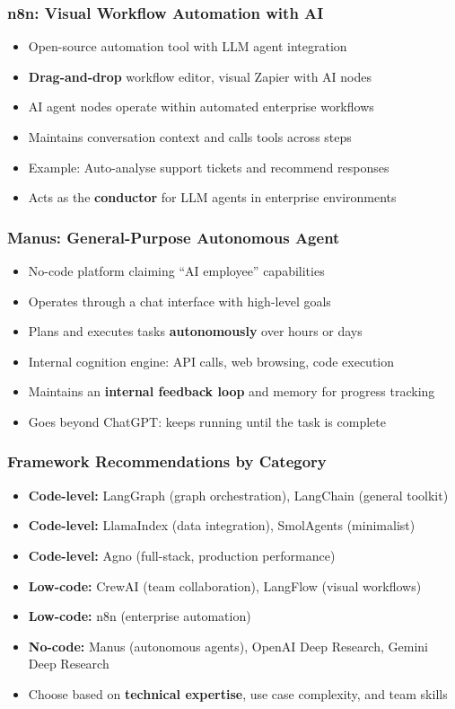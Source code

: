 \begin{frame}[fragile]\frametitle{n8n: Visual Workflow Automation with AI}
      \begin{itemize}
	  \item Open-source automation tool with LLM agent integration
	  \item \textbf{Drag-and-drop} workflow editor, visual Zapier with AI nodes
	  \item AI agent nodes operate within automated enterprise workflows
	  \item Maintains conversation context and calls tools across steps
	  \item Example: Auto-analyse support tickets and recommend responses
	  \item Acts as the \textbf{conductor} for LLM agents in enterprise environments
	  \end{itemize}
\end{frame}

\begin{frame}[fragile]\frametitle{Manus: General-Purpose Autonomous Agent}
      \begin{itemize}
	  \item No-code platform claiming ``AI employee'' capabilities
	  \item Operates through a chat interface with high-level goals
	  \item Plans and executes tasks \textbf{autonomously} over hours or days
	  \item Internal cognition engine: API calls, web browsing, code execution
	  \item Maintains an \textbf{internal feedback loop} and memory for progress tracking
	  \item Goes beyond ChatGPT: keeps running until the task is complete
	  \end{itemize}
\end{frame}

\begin{frame}[fragile]\frametitle{Framework Recommendations by Category}
      \begin{itemize}
	  \item \textbf{Code-level:} LangGraph (graph orchestration), LangChain (general toolkit)
	  \item \textbf{Code-level:} LlamaIndex (data integration), SmolAgents (minimalist)
	  \item \textbf{Code-level:} Agno (full-stack, production performance)
	  \item \textbf{Low-code:} CrewAI (team collaboration), LangFlow (visual workflows)
	  \item \textbf{Low-code:} n8n (enterprise automation)
	  \item \textbf{No-code:} Manus (autonomous agents), OpenAI Deep Research, Gemini Deep Research
	  \item Choose based on \textbf{technical expertise}, use case complexity, and team skills
	  \end{itemize}
\end{frame}


